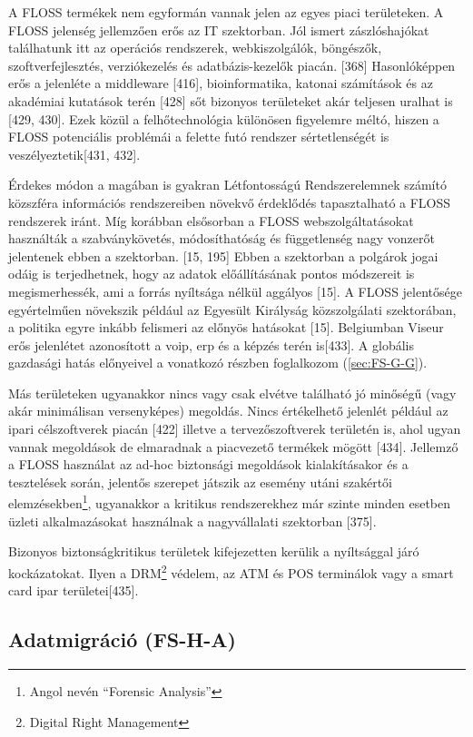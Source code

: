 \documentclass[12pt,magyar,a4paper,oneside]{scrreprt}
\begin{document}
A FLOSS termékek nem egyformán vannak jelen az egyes piaci területeken.
A FLOSS jelenség jellemzően erős az IT szektorban. Jól ismert
zászlóshajókat találhatunk itt az operációs rendszerek, webkiszolgálók,
böngészők, szoftverfejlesztés, verziókezelés és adatbázis-kezelők
piacán. {[}368{]} Hasonlóképpen erős a jelenléte a middleware {[}416{]},
bioinformatika, katonai számítások és az akadémiai kutatások terén
{[}428{]} sőt bizonyos területeket akár teljesen uralhat is {[}429,
430{]}. Ezek közül a felhőtechnológia különösen figyelemre méltó, hiszen
a FLOSS potenciális problémái a felette futó rendszer sértetlenségét is
veszélyeztetik{[}431, 432{]}.

Érdekes módon a magában is gyakran Létfontosságú Rendszerelemnek számító
közszféra információs rendszereiben növekvő érdeklődés tapasztalható a
FLOSS rendszerek iránt. Míg korábban elsősorban a FLOSS
webszolgáltatásokat használták a szabványkövetés, módosíthatóság és
függetlenség nagy vonzerőt jelentenek ebben a szektorban. {[}15, 195{]}
Ebben a szektorban a polgárok jogai odáig is terjedhetnek, hogy az
adatok előállításának pontos módszereit is megismerhessék, ami a forrás
nyíltsága nélkül aggályos {[}15{]}. A FLOSS jelentősége egyértelműen
növekszik például az Egyesült Királyság közszolgálati szektorában, a
politika egyre inkább felismeri az előnyös hatásokat {[}15{]}.
Belgiumban Viseur erős jelenlétet azonosított a voip, erp és a képzés
terén is{[}433{]}. A globális gazdasági hatás előnyeivel a vonatkozó
részben foglalkozom (\ref{sec:FS-G-G}).

Más területeken ugyanakkor nincs vagy csak elvétve található jó minőségű
(vagy akár minimálisan versenyképes) megoldás. Nincs értékelhető
jelenlét például az ipari célszoftverek piacán {[}422{]} illetve a
tervezőszoftverek területén is, ahol ugyan vannak megoldások de
elmaradnak a piacvezető termékek mögött {[}434{]}. Jellemző a FLOSS
használat az ad-hoc biztonsági megoldások kialakításakor és a
tesztelések során, jelentős szerepet játszik az esemény utáni szakértői
elemzésekben\footnote{Angol nevén ``Forensic Analysis''}, ugyanakkor a
kritikus rendszerekhez már szinte minden esetben üzleti alkalmazásokat
használnak a nagyvállalati szektorban {[}375{]}.

Bizonyos biztonságkritikus területek kifejezetten kerülik a nyíltsággal
járó kockázatokat. Ilyen a DRM\footnote{Digital Right Management}
védelem, az ATM és POS terminálok vagy a smart card ipar
területei{[}435{]}.

\hypertarget{sec:FS-H-A}{%
\subsection{Adatmigráció (FS-H-A)}\label{sec:FS-H-A}}
\end{document}
